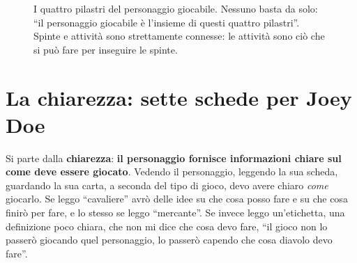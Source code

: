 \begin{figure}[htbp]
\centering
{}
\caption{I quattro pilastri del personaggio giocabile. Nessuno basta da solo:
``il personaggio giocabile è l'insieme di questi quattro pilastri''. Spinte e
attività sono strettamente connesse: le attività sono ciò che si può fare per
inseguire le spinte.}
\label{a4:fig:pilastri}
\end{figure}

\section{La chiarezza: sette schede per Joey Doe}
\label{a4:sec:chiarezza}

Si parte dalla \textbf{chiarezza}: \textbf{il personaggio fornisce informazioni
chiare sul come deve essere giocato}. Vedendo il personaggio, leggendo la sua
scheda, guardando la sua carta, a seconda del tipo di gioco, devo avere chiaro
\emph{come} giocarlo. Se leggo ``cavaliere'' avrò delle idee su che cosa posso fare
e su che cosa finirò per fare, e lo stesso se leggo ``mercante''. Se invece leggo
un'etichetta, una definizione poco chiara, che non mi dice che cosa devo fare,
``il gioco non lo passerò giocando quel personaggio, lo passerò capendo che cosa
diavolo devo fare''.

